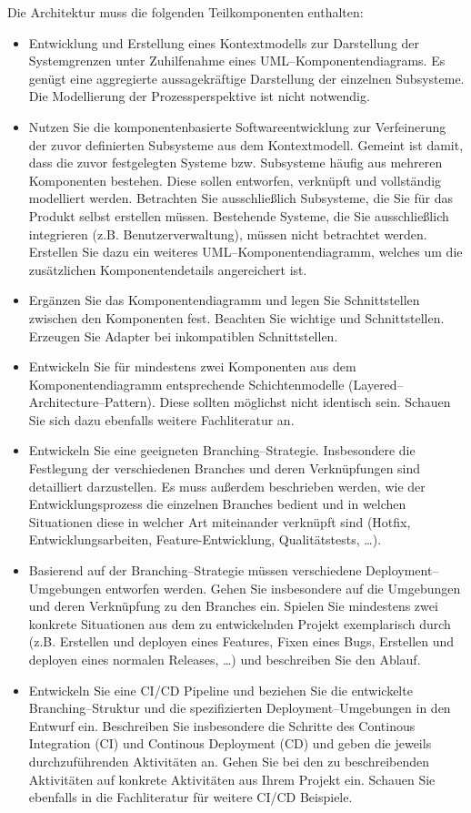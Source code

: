 Die Architektur muss die folgenden Teilkomponenten enthalten:
\begin{itemize}
\item Entwicklung und Erstellung eines Kontextmodells zur Darstellung der Systemgrenzen unter Zuhilfenahme eines UML--Komponentendiagrams.
    Es genügt eine aggregierte aussagekräftige Darstellung der einzelnen Subsysteme.
    Die Modellierung der Prozessperspektive ist nicht notwendig.
\item Nutzen Sie die komponentenbasierte Softwareentwicklung zur Verfeinerung der zuvor definierten Subsysteme aus dem Kontextmodell.
    Gemeint ist damit, dass die zuvor festgelegten Systeme bzw. Subsysteme häufig aus mehreren Komponenten bestehen.
    Diese sollen entworfen, verknüpft und vollständig modelliert werden.
    Betrachten Sie ausschließlich Subsysteme, die Sie für das Produkt selbst erstellen müssen.
    Bestehende Systeme, die Sie ausschließlich integrieren (z.B. Benutzerverwaltung), müssen nicht betrachtet werden.
    Erstellen Sie dazu ein weiteres UML--Komponentendiagramm, welches um die zusätzlichen Komponentendetails angereichert ist.
\item Ergänzen Sie das Komponentendiagramm und legen Sie Schnittstellen zwischen den Komponenten fest.
    Beachten Sie wichtige  und  Schnittstellen.
    Erzeugen Sie Adapter bei inkompatiblen Schnittstellen.
\item Entwickeln Sie für mindestens zwei Komponenten aus dem Komponentendiagramm entsprechende Schichtenmodelle (Layered--Architecture--Pattern).
    Diese sollten möglichst nicht identisch sein.
    Schauen Sie sich dazu ebenfalls weitere Fachliteratur an.
\item Entwickeln Sie eine geeigneten Branching--Strategie.
    Insbesondere die Festlegung der verschiedenen Branches und deren Verknüpfungen sind detailliert darzustellen.
    Es muss außerdem beschrieben werden, wie der Entwicklungsprozess die einzelnen Branches bedient und in welchen Situationen diese in welcher Art miteinander verknüpft sind (Hotfix, Entwicklungsarbeiten, Feature-Entwicklung, Qualitätstests, \dots).
\item Basierend auf der Branching--Strategie müssen verschiedene Deployment--Umgebungen entworfen werden.
    Gehen Sie insbesondere auf die Umgebungen und deren Verknüpfung zu den Branches ein.
    Spielen Sie mindestens zwei konkrete Situationen aus dem zu entwickelnden Projekt exemplarisch durch (z.B. Erstellen und deployen eines Features, Fixen eines Bugs, Erstellen und deployen eines normalen Releases, \dots) und beschreiben Sie den Ablauf.
\item Entwickeln Sie eine CI/CD Pipeline und beziehen Sie die entwickelte Branching--Struktur und die spezifizierten Deployment--Umgebungen in den Entwurf ein.
    Beschreiben Sie insbesondere die Schritte des Continous Integration (CI) und Continous Deployment (CD) und geben die jeweils durchzuführenden Aktivitäten an.
    Gehen Sie bei den zu beschreibenden Aktivitäten auf konkrete Aktivitäten aus Ihrem Projekt ein.
    Schauen Sie ebenfalls in die Fachliteratur für weitere CI/CD Beispiele.
\end{itemize}